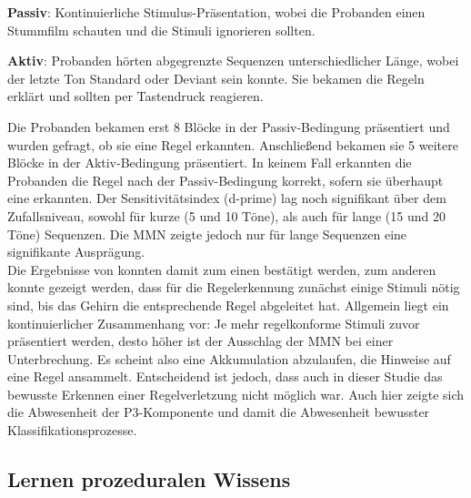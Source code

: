 \documentclass[doc,a4paper,12pt]{apa6}
\begin{document}

\begin{compactitem}
  \item \textbf{Passiv}: Kontinuierliche Stimulus-Präsentation, wobei die Probanden einen Stummfilm schauten und die Stimuli ignorieren sollten.
  \item \textbf{Aktiv}: Probanden hörten abgegrenzte Sequenzen unterschiedlicher Länge, wobei der letzte Ton Standard oder Deviant sein konnte. Sie bekamen die Regeln erklärt und sollten per Tastendruck reagieren.
\end{compactitem}

Die Probanden bekamen erst 8 Blöcke in der Passiv-Bedingung präsentiert und wurden gefragt, ob sie eine Regel erkannten. Anschließend bekamen sie 5 weitere Blöcke in der Aktiv-Bedingung präsentiert. In keinem Fall erkannten die Probanden die Regel nach der Passiv-Bedingung korrekt, sofern sie überhaupt eine erkannten. Der Sensitivitätsindex (d-prime) lag noch signifikant über dem Zufallsniveau, sowohl für kurze (5 und 10 Töne), als auch für lange (15 und 20 Töne) Sequenzen. Die MMN zeigte jedoch nur für lange Sequenzen eine signifikante Ausprägung.\\
Die Ergebnisse von \textcite{paavilainen2007preattentive} konnten damit zum einen bestätigt werden, zum anderen konnte gezeigt werden, dass für die Regelerkennung zunächst einige Stimuli nötig sind, bis das Gehirn die entsprechende Regel abgeleitet hat. Allgemein liegt ein kontinuierlicher Zusammenhang vor: Je mehr regelkonforme Stimuli zuvor präsentiert werden, desto höher ist der Ausschlag der MMN bei einer Unterbrechung. Es scheint also eine Akkumulation abzulaufen, die Hinweise auf eine Regel ansammelt. Entscheidend ist jedoch, dass auch in dieser Studie das bewusste Erkennen einer Regelverletzung nicht möglich war. Auch hier zeigte sich die Abwesenheit der P3-Komponente und damit die Abwesenheit bewusster Klassifikationsprozesse.

\subsection{Lernen prozeduralen Wissens}
\end{document}
